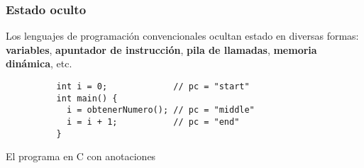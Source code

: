 \documentclass{beamer}
\begin{document}
\begin{frame}[fragile]
  \frametitle{Estado oculto}

  Los lenguajes de programación convencionales ocultan estado en diversas
  formas: \textbf{variables},
          \textbf{apuntador de instrucción},
          \textbf{pila de llamadas},
          \textbf{memoria dinámica}, etc.

  \begin{listing}[H]
    \begin{center}
      \begin{minipage}{0.7\textwidth}
        \begin{verbatim}
          int i = 0;             // pc = "start"
          int main() {
            i = obtenerNumero(); // pc = "middle"
            i = i + 1;           // pc = "end"
          }
        \end{verbatim}
      \end{minipage}
    \end{center}
    \caption{El programa en C con anotaciones}
    \label{lst:cprogram_hidden}
  \end{listing}
\end{frame}
\end{document}
